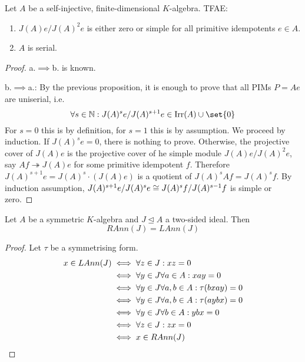 \documentclass[fontsize=11pt,fleqn,a4paper]{scrartcl}
\begin{document}
\begin{lemma}[11.3.7]
Let $A$ be a self-injective, finite-dimensional $K$-algebra. TFAE:
\begin{enumerate}
\item $J(A)e / J(A)^2e$ is either zero or simple for all primitive idempotents $e\in A$.
\item $A$ is serial.
\end{enumerate}
\end{lemma}
\begin{proof}
a.$\implies$b. is known.

b.$\implies$a.: By the previous proposition, it is enough to prove that all PIMs $P=Ae$ are uniserial, i.e.
\[\forall s\in\IN: J(A)^s e / J(A)^{s+1} e\in\Irr(A)\cup\set{0}\]
For $s=0$ this is by definition, for $s=1$ this is by assumption. We proceed by induction. If $J(A)^s e=0$, there is nothing to prove. Otherwise, the projective cover of $J(A)e$ is the projective cover of he simple module $J(A)e/J(A)^2e$, say $Af \twoheadrightarrow J(A)e$ for some primitive idempotent $f$. Therefore $J(A)^{s+1}e=J(A)^s\cdot(J(A)e)$ is a quotient of $J(A)^s Af = J(A)^s f$. By induction assumption, $J(A)^{s+1}e/J(A)^se \cong J(A)^sf/J(A)^{s-1}f$ is simple or zero.
\end{proof}

\begin{lemma}
Let $A$ be a symmetric $K$-algebra and $J\unlhd A$ a two-sided ideal. Then
\[RAnn(J) = LAnn(J)\]
\end{lemma}
\begin{proof}
Let $\tau$ be a symmetrising form.
\begin{align*}
x\in LAnn(J) &\iff \forall z\in J: xz=0 \\
&\iff \forall y\in J \forall a\in A: xay=0 \\
&\iff \forall y\in J\forall a,b\in A: \tau(bxay) = 0\\
&\iff \forall y\in J\forall a,b\in A: \tau(aybx) = 0\\
&\iff \forall y\in J\forall b\in A: ybx = 0\\
&\iff \forall z\in J: zx=0 \\
&\iff x\in RAnn(J) \qedhere
\end{align*}
\end{proof}
\end{document}
